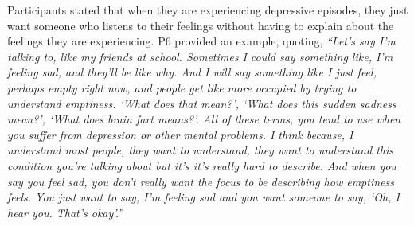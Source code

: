         Participants stated that when they are experiencing depressive episodes, they just want someone who listens to their feelings without having to explain about the feelings they are experiencing. P6 provided an example, quoting, 
                \textit{
                ``Let's say I'm talking to, like my friends at school. Sometimes I could say something like, I'm feeling sad, and they'll be like why. And I will say something like I just feel, perhaps empty right now, and people get like more occupied by trying to understand emptiness. `What does that mean?', `What does this sudden sadness mean?', `What does brain fart means?'. All of these terms, you tend to use when you suffer from depression or other mental problems. I think because, I understand most people, they want to understand, they want to understand this condition you're talking about but it's it's really hard to describe. And when you say you feel sad, you don't really want the focus to be  describing how emptiness feels.
                You just want to say, I'm feeling sad and you want someone to say, `Oh, I hear you. That's okay'.''}
        

